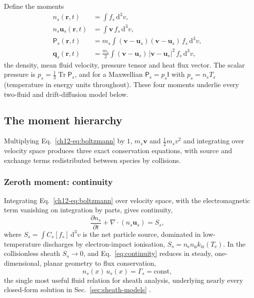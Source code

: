 Define the moments
\begin{align}
n_s(\mathbf{r},t) &= \int f_s\,\mathrm{d}^3v, \label{eq:mom0}\\
n_s\mathbf{u}_s(\mathbf{r},t) &= \int \mathbf{v}\,f_s\,\mathrm{d}^3v, \label{eq:mom1}\\
\mathsf{P}_s(\mathbf{r},t) &= m_s\int (\mathbf{v}-\mathbf{u}_s)(\mathbf{v}-\mathbf{u}_s)\,f_s\,\mathrm{d}^3v, \label{eq:mom2}\\
\mathbf{q}_s(\mathbf{r},t) &= \frac{m_s}{2}\int (\mathbf{v}-\mathbf{u}_s)\,|\mathbf{v}-\mathbf{u}_s|^2\,f_s\,\mathrm{d}^3v, \label{eq:mom3}
\end{align}
the density, mean fluid velocity, pressure tensor and heat flux vector. The scalar pressure is $p_s = \tfrac{1}{3}\operatorname{Tr}\mathsf{P}_s$, and for a Maxwellian $\mathsf{P}_s = p_s\mathsf{I}$ with $p_s = n_s T_s$ (temperature in energy units throughout). These four moments underlie every two-fluid and drift-diffusion model below.

\subsection{The moment hierarchy}

Multiplying Eq.~\eqref{ch12-eq:boltzmann} by $1$, $m_s\mathbf{v}$ and $\tfrac{1}{2}m_s v^2$ and integrating over velocity space produces three exact conservation equations, with source and exchange terms redistributed between species by collisions.

\subsubsection{Zeroth moment: continuity}

Integrating Eq.~\eqref{ch12-eq:boltzmann} over velocity space, with the electromagnetic term vanishing on integration by parts, gives continuity,
\begin{equation}
\frac{\partial n_s}{\partial t} + \nabla\cdot(n_s\mathbf{u}_s) = S_s,
\label{eq:continuity}
\end{equation}
where $S_s = \int C_s[f_s]\,\mathrm{d}^3v$ is the net particle source, dominated in low-temperature discharges by electron-impact ionisation, $S_s = n_{\mathrm{e}} n_{\mathrm{n}} k_{\mathrm{iz}}(T_{\mathrm{e}})$. In the collisionless sheath $S_s\to0$, and Eq.~\eqref{eq:continuity} reduces in steady, one-dimensional, planar geometry to flux conservation,
\begin{equation}
n_s(x)\,u_s(x) = \Gamma_s = \mathrm{const},
\label{eq:flux-conservation}
\end{equation}
the single most useful fluid relation for sheath analysis, underlying nearly every closed-form solution in Sec.~\ref{sec:sheath-models} \cite{ref0013}.

